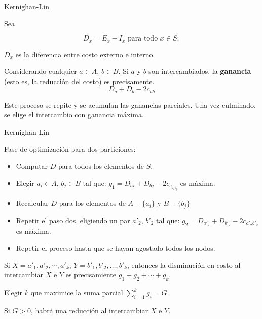 \begin{frame}{Kernighan-Lin}

Sea

\begin{equation*}
D_x = E_x - I_x \text{ para todo } x \in S; 
\end{equation*}

$D_x$ es la diferencia entre costo externo e interno.

Considerando cualquier $a \in A$, $b \in B$. Si $a$ y $b$ son intercambiados, la \textbf{ganancia}
(esto es, la reducción del costo) es precisamente.
\begin{equation*}
D_a + D_b - 2c_{ab}    
\end{equation*}

Este proceso se repite y se acumulan las ganancias parciales.
Una vez culminado, se elige el intercambio con ganancia máxima.

\end{frame}


\begin{frame}{Kernighan-Lin}

  Fase de optimización para dos particiones:

  \begin{itemize}
    \item Computar $D$ para todos los elementos de $S$.

    \item Elegir $a_i \in A$, $b_j \in B$ tal que:
          $g_1 = D_{ai} + D_{bj} - 2c_{c_{a_ib_j}}$ es máxima.

    \item Recalcular $D$ para los elementos de $A - \{a_i\}$ y $B - \{b_j\}$

    \item Repetir el paso dos, eligiendo un par $a'_2$, $b'_2$ tal que:
          $g_2 = D_{a'_2} + D_{b'_2} - 2c_{a'_2b'_2}$ es máxima.

    \item Repetir el proceso hasta que se hayan agostado todos los nodos.
  \end{itemize}

  Si $X = a'_1, a'_2, \cdots, a'_k$, $Y = b'_1, b'_2, \ldots, b'_k$, entonces
  la disminución en costo al intercambiar $X$ e $Y$ es precisamiente
  $g_1 + g_2 + \cdots + g_k$.

  Elegir $k$ que maximice la suma parcial $\sum_{i=1}^k g_i = G$.

  Si $G > 0$, habrá una reducción al intercambiar $X$ e $Y$.
\end{frame}


